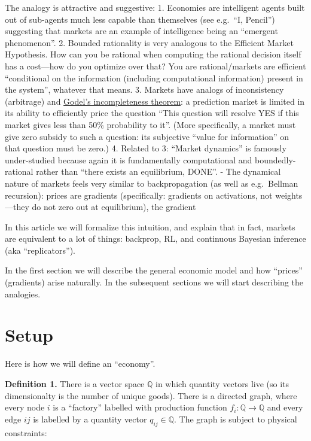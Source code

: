 The analogy is attractive and suggestive: 1. Economies are intelligent agents built out of sub-agents much less capable than themselves (see e.g.~``I, Pencil'') suggesting that markets are an example of intelligence being an ``emergent phenomenon''. 2. Bounded rationality is very analogous to the Efficient Market Hypothesis. How can you be rational when computing the rational decision itself has a cost---how do you optimize over that? You are rational/markets are efficient ``conditional on the information (including computational information) present in the system'', whatever that means. 3. Markets have analogs of inconsistency (arbitrage) and \href{https://www.lesswrong.com/posts/xqxXrAohXSD3akYCg/meaningful-things-are-those-the-universe-possesses-a}{Godel's incompleteness theorem}: a prediction market is limited in its ability to efficiently price the question ``This question will resolve YES if this market gives less than 50\% probability to it''. (More specifically, a market must give zero subsidy to such a question: its subjective ``value for information'' on that question must be zero.) 4. Related to 3: ``Market dynamics'' is famously under-studied because again it is fundamentally computational and boundedly-rational rather than ``there exists an equilibrium, DONE''. - The dynamical nature of markets feels very similar to backpropagation (as well as e.g.~Bellman recursion): prices are gradients (specifically: gradients on activations, not weights---they do not zero out at equilibrium), the gradient

In this article we will formalize this intuition, and explain that in fact, markets are equivalent to a lot of things: backprop, RL, and continuous Bayesian inference (aka ``replicators'').

In the first section we will describe the general economic model and how ``prices'' (gradients) arise naturally. In the subsequent sections we will start describing the analogies.

\hypertarget{setup}{%
\section{Setup}\label{setup}}

Here is how we will define an ``economy''.

\textbf{Definition 1.} There is a vector space \(\mathbb{Q}\) in which quantity vectors live (so its dimensionalty is the number of unique goods). There is a directed graph, where every node \(i\) is a ``factory'' labelled with production function \(f_i:\mathbb{Q}\to\mathbb{Q}\) and every edge \(ij\) is labelled by a quantity vector \(q_{ij}\in\mathbb{Q}\). The graph is subject to physical constraints:

